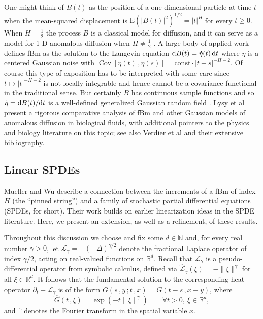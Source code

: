 \documentclass[reqno]{amsart}
\DeclareMathOperator{\Cov}{Cov}
\newcommand{\<}{\langle}
\renewcommand{\>}{\rangle}
\newcommand{\N}{\mathbb{N}}
\newcommand{\R}{\mathbb{R}}
\newcommand{\E}{\mathrm{E}}
\newcommand{\1}{\mathbb{1}}
\renewcommand{\d}{{\rm d}}
\renewcommand{\ge}{\geqslant}
\theoremstyle{definition}
\numberwithin{equation}{section}
\begin{document}
One might think of $B(t)$ as the position of a one-dimensional particle
at time $t$ when the mean-squared displacement is
$\E(|B(t)|^2)^{1/2} = |t|^H$ for 
every $t\ge0$. 
When $H=\frac12$ the process $B$ is a classical model for diffusion,
and it can serve as a model for 1-D anomalous diffusion when $H\neq\frac12$
\cite{Mandelbrot}. A large body of applied work
defines fBm  as the solution to the Langevin equation $\d B(t) = \dot\eta(t)\,\d t$ where  $\dot\eta$
is a centered Gaussian noise with 
$\Cov[\dot\eta(t)\,,\dot\eta(s)]=\text{const}\cdot |t-s|^{-H-2}.$
Of course this type of exposition has to be interpreted
with some care since $t\mapsto |t|^{-H-2}$ is not locally integrable
and hence cannot be a covariance functional in the traditional sense. 
But certainly $B$ has continuous sample functions  \cite{Kolmogorov,MandelbrotVanNess} and so
$\dot\eta = \d B(t)/\d t$ is a well-defined  generalized
Gaussian random field \cite{Dudley,Minlos,DFL,Gross}.
Lysy et al \cite{LPHFMVM} 
present a rigorous comparative analysis of fBm and other Gaussian models of 
anomalous diffusion in biological fluids, with additional pointers to the 
physics and biology literature on this topic; see also Verdier et al \cite{VLCVM}
and their extensive bibliography. 


\subsection{Linear SPDEs}\label{subsec:SPDE}
Mueller and Wu \cite{MWB} describe a connection between the
increments of a fBm of index $H$ (the ``pinned string'') and a family of 
stochastic partial differential equations (SPDEs, for short). 
Their work builds on earlier linearization ideas \cite{LeiNualart,Walsh,KSXZ,HP,FKM}
in the SPDE literature.
Here, we present an extension, as well as a refinement, of these results.

Throughout this discussion we choose and fix some $d\in\N$ and, 
for every real number $\gamma>0$, let 
$\mathcal{L}_\gamma = -(-\Delta)^{\gamma/2}$
denote the fractional Laplace operator
of index $\gamma/2$, acting on real-valued functions on $\R^d$. Recall 
that $\mathcal{L}_\gamma$ is a pseudo-differential operator
from symbolic calculus, defined via 
$\hat{\mathcal{L}}_\gamma (\xi) = -\|\xi \|^\gamma$ for all $\xi\in\R^d.$
It follows that the fundamental solution to the
corresponding heat operator $\partial_t - \mathcal{L}_\gamma$ 
is of the form $G(s\,,y\,;t\,,x)=G(t-s\,,x-y)$,
where
\begin{equation}\label{hat:G}
	\hat{G}(t\,,\xi) = \exp(-t\| \xi \|^\gamma)\qquad\forall t>0,\ \xi\in\R^d,
\end{equation}
and $\hat{\phantom{a}}$ denotes the Fourier transform in the spatial variable $x$.
\end{document}
